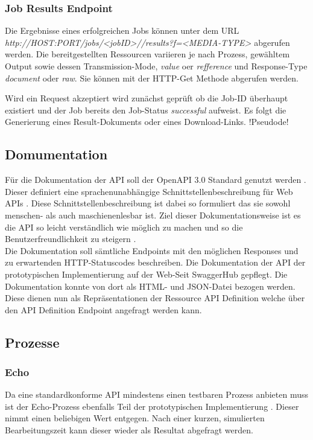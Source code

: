 \subsubsection{Job Results Endpoint}
Die Ergebnisse eines erfolgreichen Jobs können unter dem URL \textit{http://HOST:PORT/jobs/<jobID>//results?f=<MEDIA-TYPE>} abgerufen werden. 
Die bereitgestellten Ressourcen variieren je nach Prozess, gewähltem Output sowie dessen Transmission-Mode, \textit{value} oer \textit{refference} und Response-Type
\textit{document} oder \textit{raw}. Sie können mit der HTTP-Get Methode abgerufen werden.

Wird ein Request akzeptiert wird zunächst geprüft ob die Job-ID überhaupt existiert und der Job bereits den Job-Status \textit{successful} aufweist. 
Es folgt die Generierung eines Result-Dokuments oder eines Download-Links. 
!Pseudode!

\subsection{Domumentation}
Für die Dokumentation der API soll der OpenAPI 3.0 Standard genutzt werden \cite{ogc_api_processes_core}. 
Dieser definiert eine sprachenunabhängige Schnittstellenbeschreibung für Web APIs \cite{open_api}. 
Diese Schnittstellenbeschreibung ist dabei so formuliert das sie sowohl menschen- als auch maschienenlesbar ist. 
Ziel dieser Dokumentationsweise ist es die API so leicht verständlich wie möglich zu machen und so die Benutzerfreundlichkeit zu steigern \cite{open_api}. \\ 
Die Dokumentation soll sämtliche Endpoints mit den möglichen Responses und zu erwartenden HTTP-Statuscodes beschreiben. 
Die Dokumentation der API der prototypischen Implementierung auf der Web-Seit SwaggerHub gepflegt. Die Dokumentation konnte von dort als HTML- 
und JSON-Datei bezogen werden. Diese dienen nun als Repräsentationen der Ressource API Definition welche über den API Definition Endpoint angefragt werden kann. 

\subsection{Prozesse}
\subsubsection{Echo}
Da eine standardkonforme API mindestens einen testbaren Prozess anbieten muss ist der Echo-Prozess ebenfalls Teil der prototypischen Implementierung \cite{ogc_api_processes_core}. 
Dieser nimmt einen beliebigen Wert entgegen. Nach einer kurzen, simulierten Bearbeitungszeit kann dieser wieder als Resultat abgefragt werden. 

